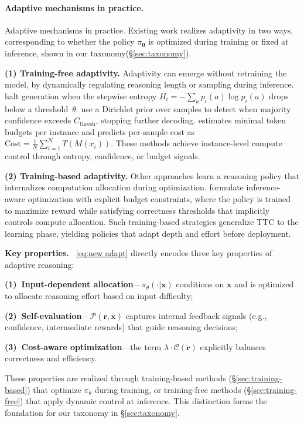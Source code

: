 \documentclass[11pt]{article}
\begin{document}
\paragraph{Adaptive mechanisms in practice.}

Adaptive mechanisms in practice. Existing work realizes adaptivity in two ways, corresponding to whether the policy $\pi_{\boldsymbol{\theta}}$ is optimized during 
training or fixed at inference, shown in our taxonomy(§\ref{sec:taxonomy}).


\textbf{(1) Training-free adaptivity.}
Adaptivity can emerge without retraining the model, by dynamically
regulating reasoning length or sampling during inference.
\citet{laaouach2025halt} halt generation when the stepwise entropy
\(H_i=-\!\sum_a p_i(a)\log p_i(a)\) drops below a threshold~$\theta$.
\citet{aggarwal2023letssamplestepstep} use a Dirichlet prior over
samples to detect when majority confidence exceeds \(C_{\text{thresh}}\),
stopping further decoding.
\citet{Han2025TALE} estimates minimal token budgets per instance and
predicts per-sample cost as
\(\text{Cost}=\frac{1}{N}\sum_{i=1}^N T(M(x_i))\).
These methods achieve instance-level compute control through
entropy, confidence, or budget signals.

\textbf{(2) Training-based adaptivity.}
Other approaches learn a reasoning policy that internalizes computation
allocation during optimization.
\citet{Yu2025IBPO} formulate inference-aware optimization
with explicit budget constraints, where the policy is trained 
to maximize reward while satisfying correctness thresholds 
that implicitly controls compute allocation.
Such training-based strategies generalize TTC to the learning phase,
yielding policies that adapt depth and effort before deployment.

\textbf{Key properties.} ~\eqref{eq:new adapt} 
directly encodes three key properties of adaptive reasoning: 

\textbf{(1)~Input-dependent allocation}—$\pi_\theta(\cdot|\mathbf{x})$ 
conditions on $\mathbf{x}$ and is optimized to allocate reasoning 
effort based on input difficulty;

\textbf{(2)~Self-evaluation}—$\mathcal{P}(\mathbf{r}, \mathbf{x})$ 
captures internal feedback signals (e.g., confidence, intermediate 
rewards) that guide reasoning decisions;

\textbf{(3)~Cost-aware optimization}—the term 
$\lambda \cdot \mathcal{C}(\mathbf{r})$ explicitly balances 
correctness and efficiency.

These properties are realized through training-based methods 
(\S\ref{sec:training-based}) that optimize $\pi_\theta$ during 
training, or training-free methods (\S\ref{sec:training-free}) that apply dynamic control at inference. This distinction forms 
the foundation for our taxonomy in \S\ref{sec:taxonomy}.
\end{document}
